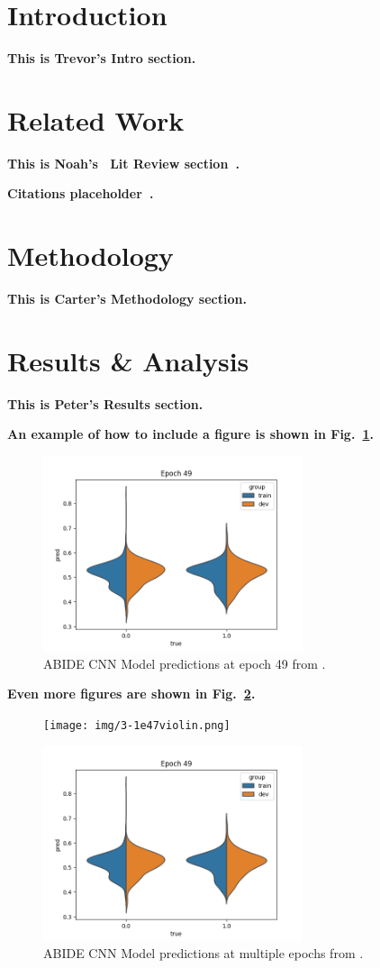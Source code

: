 \documentclass[conference, letterpaper, 11pt]{IEEEtran}
\begin{document}
\section{Introduction} \label{IN}
\textbf{This is Trevor's Intro section.} \lipsum[1-2]

\section{Related Work} \label{RW}
\textbf{This is Noah's~\cite{b1} Lit Review section~\cite{b2}.} \lipsum[1]

\textbf{Citations placeholder~\cite{b3, b4, b5}.} \lipsum[1-3]

\section{Methodology} \label{ME}
\textbf{This is Carter's Methodology section.} \lipsum[1-7]

\section{Results \& Analysis} \label{RA}
\textbf{This is Peter's Results section.} \lipsum[1]

\textbf{An example of how to include a figure is shown in Fig.~\ref{fig:xmp}.} \lipsum[1]

\begin{figure}[htbp]
    \centerline{\includegraphics[width=3in]{img/3-1e49violin.png}}
    \caption{ABIDE CNN Model predictions at epoch 49 from \cite{aiad}.}
    \label{fig:xmp}
\end{figure}

\textbf{Even more figures are shown in Fig.~\ref{fig:xmp2}.} \lipsum[1]

\begin{figure}[htbp]
    \centerline{\texttt{[image: img/3-1e47violin.png]}}
    \centerline{\includegraphics[width=3in]{img/3-1e49violin.png}}
    \caption{ABIDE CNN Model predictions at multiple epochs from \cite{aiad}.}
    \label{fig:xmp2}
\end{figure}
\end{document}
